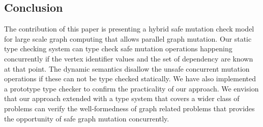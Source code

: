 \subsection{Conclusion}

The contribution of this paper is presenting a hybrid safe mutation check model for large scale graph computing that allows parallel graph mutation. Our static type checking system can type check safe mutation operations happening concurrently if the vertex identifier values and the set of dependency are known at that point. The dynamic semantics disallow the unsafe concurrent mutation operations if these can not be type checked statically. We have also implemented a prototype type checker to confirm the practicality of our approach. We envision that our approach extended with a type system that covers a wider class of problems can verify the well-formedness of graph related problems that provides the opportunity of safe graph mutation concurrently.  
